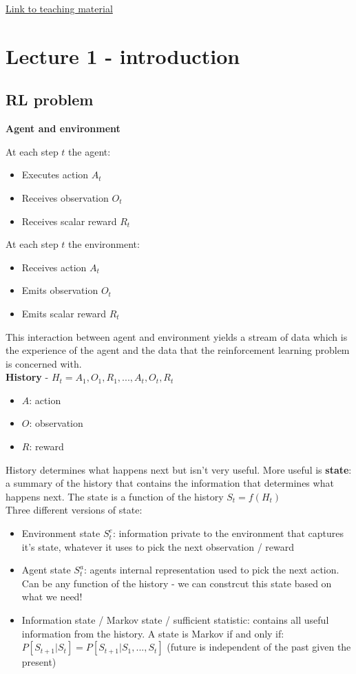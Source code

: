 \documentclass{article}
\begin{document}
\href{https://www.davidsilver.uk/teaching/}{Link to teaching material}

\section{Lecture 1 - introduction}

\subsection{RL problem}

\textbf{Agent and environment}

At each step $t$ the agent:
\begin{itemize}
    \item Executes action $A_t$
    \item Receives observation $O_t$
    \item Receives scalar reward $R_t$
\end{itemize}

At each step $t$ the environment:
\begin{itemize}
    \item Receives action $A_t$
    \item Emits observation $O_t$
    \item Emits scalar reward $R_t$
\end{itemize}

This interaction between agent and environment yields a stream of data which is the experience of the agent and the data that the reinforcement learning problem is concerned with.\\

\textbf{History} - $H_t = A_1, O_1, R_1, ..., A_t, O_t, R_t$

\begin{itemize}
    \item $A$: action
    \item $O$: observation
    \item $R$: reward
\end{itemize}

History determines what happens next but isn't very useful. More useful is \textbf{state}: a summary of the history that contains the information that determines what happens next. The state is a function of the history $S_t = f(H_t)$ \\

Three different versions of state:
\begin{itemize}
    \item Environment state $S_t^e$: information private to the environment that captures it's state, whatever it uses to pick the next observation / reward
    \item Agent state $S_t^a$: agents internal representation used to pick the next action. Can be any function of the history - we can constrcut this state based on what we need!
    \item Information state / Markov state / sufficient statistic: contains all useful information from the history. A state is Markov if and only if: $P[S_{t+1}|S_t] = P[S_{t+1}| S_1, ..., S_t]$ (future is independent of the past given the present)
\end{itemize}
\end{document}
